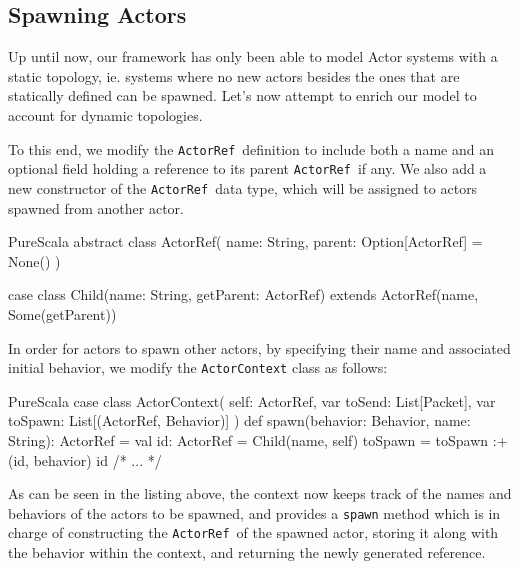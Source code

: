 \documentclass[a4paper,twoside]{article}
\newcommand{\InlineS}[1]{\lstinline[language=PureScala,basicstyle=\small\ttfamily,columns=fixed]|#1|}
\newcommand{\TODO}[1]{\textcolor{YellowOrange}{(TODO: #1)}} %
\newcommand{\ActorRef}{\InlineS{ActorRef}\ }
\newcommand{\stt}[1]{\texttt{\small{#1}}}
\begin{document}
%

%

\clearpage

\subsection{Spawning Actors}
\label{spawn}

Up until now, our framework has only been able to model Actor systems with a static topology, ie. systems where no new actors besides the ones that are statically defined can be spawned. Let's now attempt to enrich our model to account for dynamic topologies.

To this end, we modify the \ActorRef definition to include both a name and an optional field holding a reference to its parent \ActorRef if any. We also add a new constructor of the \ActorRef data type, which will be assigned to actors spawned from another actor.

\begin{ShortCode}{PureScala}
abstract class ActorRef(
  name: String,
  parent: Option[ActorRef] = None()
)

case class Child(name: String, getParent: ActorRef)
  extends ActorRef(name, Some(getParent))
\end{ShortCode}

In order for actors to spawn other actors, by specifying their name and associated 
initial behavior, we modify the \stt{ActorContext} class as follows:

\begin{ShortCode}{PureScala}
case class ActorContext(
  self: ActorRef,
  var toSend: List[Packet],
  var toSpawn: List[(ActorRef, Behavior)]
) {
  def spawn(behavior: Behavior, name: String): ActorRef = {
    val id: ActorRef = Child(name, self)
    toSpawn = toSpawn :+ (id, behavior)
    id
  }
  /* ... */
}
\end{ShortCode}

As can be seen in the listing above, the context now keeps track of the names and 
behaviors of the actors to be spawned, and provides a \stt{spawn} method which is in  charge of constructing the \ActorRef of the spawned actor, storing it along with the  behavior within the context, and returning the newly generated reference.
\end{document}
